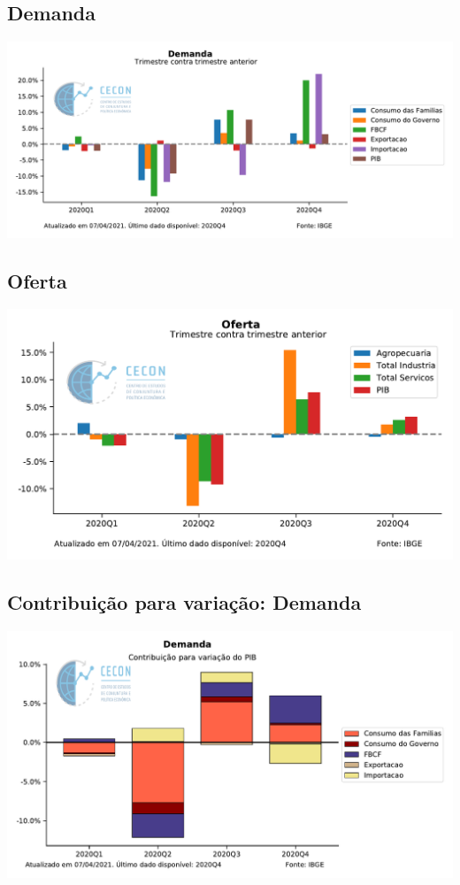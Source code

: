 \documentclass{SelfArx}
\begin{document}
\subsection*{Demanda}
\label{sec:orgdc97a2c}

\begin{center}
\includegraphics[width=.9\linewidth]{./figs/PIB/Demanda.pdf}
\end{center}

\subsection*{Oferta}
\label{sec:org571b86b}


\begin{center}
\includegraphics[width=.9\linewidth]{./figs/PIB/Oferta.pdf}
\end{center}


\subsection*{Contribuição para variação: Demanda}
\label{sec:org588a030}

\begin{center}
\includegraphics[width=.9\linewidth]{./figs/PIB/Contrib_Demanda.pdf}
\end{center}
\end{document}
